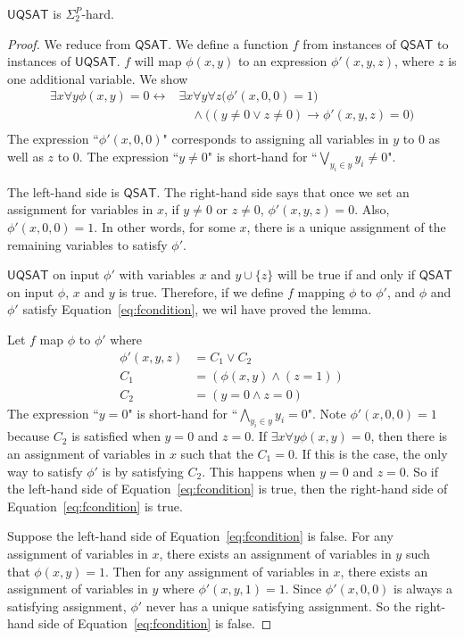 \documentclass[runningheads,a4paper]{llncs}
\newcommand{\QSAT}{\mathsf{QSAT}}
\newcommand{\UQSAT}{\mathsf{UQSAT}}
\begin{document}
\begin{lemma}
\label{lem:uqsat}
$\UQSAT$ is $\Sigma_2^P$-hard.
\end{lemma}

\begin{proof}
We reduce from $\QSAT$. We define a function $f$ from instances of $\QSAT$ to instances of $\UQSAT$. $f$ will map $\phi(x,y)$ to an expression $\phi'(x, y, z)$, where $z$ is one additional variable. We show
\begin{equation}
\label{eq:fcondition}
\begin{split}
\exists x \forall y \phi(x,y) = 0 \leftrightarrow & \exists x \forall y\forall z \big(\phi'(x, 0, 0) = 1 \big)\\
 &\quad \wedge \big((y \neq 0 \vee z \neq 0 ) \rightarrow \phi'(x, y, z) = 0 \big) \\
\end{split}
\end{equation}
The expression ``$\phi'(x, 0, 0)$" corresponds to assigning all variables in $y$ to $0$ as well as $z$ to 0. The expression ``$y \neq 0$" is short-hand for ``$\bigvee_{y_i \in y} y_i \neq 0$". 

The left-hand side is $\QSAT$. The right-hand side says that once we set an assignment for variables in $x$, if $y\neq 0$ or $z\neq 0$, $\phi'(x,y,z) = 0$. Also, $\phi'(x, 0, 0) = 1$. In other words, for some $x$, there is a unique assignment of the remaining variables to satisfy $\phi'$. 

$\UQSAT$ on input $\phi'$ with variables $x$ and $y \cup \{z\}$ will be true if and only if $\QSAT$ on input $\phi$, $x$ and $y$ is true. Therefore, if we define $f$ mapping $\phi$ to $\phi'$, and $\phi$ and $\phi'$ satisfy Equation~\ref{eq:fcondition}, we wil have proved the lemma.

Let $f$ map $\phi$ to $\phi'$ where
\begin{align}
\phi'(x, y, z) &= C_1 \vee C_2 \\
		    C_1 &=\left(\phi(x, y) \wedge (z = 1)\right) \\
		   C_2 &=  \left( y = 0 \wedge z = 0 \right) 
\end{align}
The expression ``$y = 0$" is short-hand for ``$\bigwedge_{y_i \in y} y_i = 0$". Note $\phi'(x, 0, 0) = 1$ because $C_2$ is satisfied when $y=0$ and $z = 0$. If $\exists x \forall y \phi(x, y)= 0$, then there is an assignment of variables in $x$ such that the $C_1 = 0$. If this is the case, the only way to satisfy $\phi'$ is by satisfying $C_2$. This happens when $y = 0$ and $z = 0$. So if the left-hand side of Equation~\ref{eq:fcondition} is true, then the right-hand side of Equation~\ref{eq:fcondition} is true.

Suppose the left-hand side of Equation~\ref{eq:fcondition} is false. For any assignment of variables in $x$, there exists an assignment of variables in $y$ such that $\phi(x, y) = 1$. Then for any assignment of variables in $x$, there exists an assignment of variables in $y$ where $\phi'(x, y, 1) = 1$. Since $\phi'(x, 0, 0)$ is always a satisfying assignment, $\phi'$ never has a unique satisfying assignment. So the right-hand side of Equation~\ref{eq:fcondition} is false. 
\end{proof}
\end{document}
